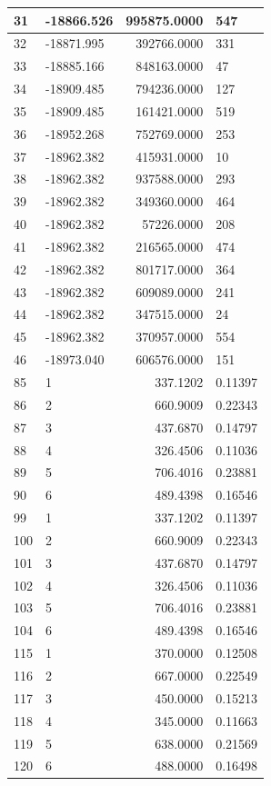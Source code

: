 \documentclass[]{book}
\theoremstyle{definition}
\theoremstyle{definition}
\theoremstyle{definition}
\theoremstyle{remark}
\begin{document}
\begin{tabular}{l|l|r|l}
\hline
31 & -18866.526 & 995875.0000 & 547\\
\hline
32 & -18871.995 & 392766.0000 & 331\\
\hline
33 & -18885.166 & 848163.0000 & 47\\
\hline
34 & -18909.485 & 794236.0000 & 127\\
\hline
35 & -18909.485 & 161421.0000 & 519\\
\hline
36 & -18952.268 & 752769.0000 & 253\\
\hline
37 & -18962.382 & 415931.0000 & 10\\
\hline
38 & -18962.382 & 937588.0000 & 293\\
\hline
39 & -18962.382 & 349360.0000 & 464\\
\hline
40 & -18962.382 & 57226.0000 & 208\\
\hline
41 & -18962.382 & 216565.0000 & 474\\
\hline
42 & -18962.382 & 801717.0000 & 364\\
\hline
43 & -18962.382 & 609089.0000 & 241\\
\hline
44 & -18962.382 & 347515.0000 & 24\\
\hline
45 & -18962.382 & 370957.0000 & 554\\
\hline
46 & -18973.040 & 606576.0000 & 151\\
\hline
85 & 1 & 337.1202 & 0.11397\\
\hline
86 & 2 & 660.9009 & 0.22343\\
\hline
87 & 3 & 437.6870 & 0.14797\\
\hline
88 & 4 & 326.4506 & 0.11036\\
\hline
89 & 5 & 706.4016 & 0.23881\\
\hline
90 & 6 & 489.4398 & 0.16546\\
\hline
99 & 1 & 337.1202 & 0.11397\\
\hline
100 & 2 & 660.9009 & 0.22343\\
\hline
101 & 3 & 437.6870 & 0.14797\\
\hline
102 & 4 & 326.4506 & 0.11036\\
\hline
103 & 5 & 706.4016 & 0.23881\\
\hline
104 & 6 & 489.4398 & 0.16546\\
\hline
115 & 1 & 370.0000 & 0.12508\\
\hline
116 & 2 & 667.0000 & 0.22549\\
\hline
117 & 3 & 450.0000 & 0.15213\\
\hline
118 & 4 & 345.0000 & 0.11663\\
\hline
119 & 5 & 638.0000 & 0.21569\\
\hline
120 & 6 & 488.0000 & 0.16498\\
\hline
\end{tabular}
\end{document}
